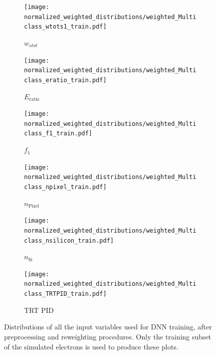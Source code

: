 \begin{figure}[htbp]
  \centering

  \begin{subfigure}[b]{0.47\textwidth}
    \centering
    \texttt{[image: normalized\_weighted\_distributions/weighted\_Multiclass\_wtots1\_train.pdf]}
    \caption{$w_{stot}$}
    \label{fig:input7}
  \end{subfigure}\hfill
  \begin{subfigure}[b]{0.47\textwidth}
    \centering
    \texttt{[image: normalized\_weighted\_distributions/weighted\_Multiclass\_eratio\_train.pdf]}
    \caption{$E_{\text{ratio}}$}
    \label{fig:input8}
  \end{subfigure}

  \vspace{0.45cm}

  \begin{subfigure}[b]{0.47\textwidth}
    \centering
    \texttt{[image: normalized\_weighted\_distributions/weighted\_Multiclass\_f1\_train.pdf]}
    \caption{$f_1$}
    \label{fig:input9}
  \end{subfigure}\hfill
  \begin{subfigure}[b]{0.47\textwidth}
    \centering
    \texttt{[image: normalized\_weighted\_distributions/weighted\_Multiclass\_npixel\_train.pdf]}
    \caption{$n_{\text{Pixel}}$}
    \label{fig:input11}
  \end{subfigure}

  \vspace{0.45cm}

  \begin{subfigure}[b]{0.47\textwidth}
    \centering
    \texttt{[image: normalized\_weighted\_distributions/weighted\_Multiclass\_nsilicon\_train.pdf]}
    \caption{$n_{\text{Si}}$}
    \label{fig:input12}
  \end{subfigure}\hfill
  \begin{subfigure}[b]{0.47\textwidth}
    \centering
    \texttt{[image: normalized\_weighted\_distributions/weighted\_Multiclass\_TRTPID\_train.pdf]}
    \caption{TRT PID}
    \label{fig:input18}
  \end{subfigure}

  \caption{Distributions of all the input variables used for DNN training, after preprocessing and reweighting procedures. Only the training subset of the simulated electrons is used to produce these plots.}
  \label{fig:dnn_inputs_distributions_B}
\end{figure}

